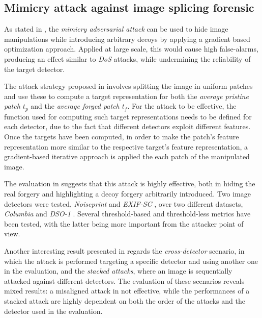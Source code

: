 \documentclass[conference]{IEEEtran} %
\begin{document}
    \subsection{Mimicry attack against image splicing forensic}
        As stated in \cite{boato2024adversarial}, the \textit{mimicry adversarial attack} can be used to hide image manipulations while introducing arbitrary decoys by applying a gradient based optimization approach. Applied at large scale, this would cause high false-alarms, producing an effect similar to \textit{DoS} attacks, while undermining the reliability of the target detector.

        The attack strategy proposed in \cite{boato2024adversarial} involves splitting the image in uniform patches and use these to compute a target representation for both the \textit{average pristine patch $t_p$} and the \textit{average forged patch $t_f$}. For the attack to be effective, the function used for computing such target representations needs to be defined for each detector, due to the fact that different detectors exploit different features. Once the targets have been computed, in order to make the patch's feature representation more similar to the respective target's feature representation, a gradient-based iterative approach is applied the each patch of the manipulated image.

        The evaluation in \cite{boato2024adversarial} suggests that this attack is highly effective, both in hiding the real forgery and highlighting a decoy forgery arbitrarily introduced. Two image detectors were tested, \textit{Noiseprint} \cite{cozzolino2019noiseprint} and \textit{EXIF-SC} \cite{huh2018fighting}, over two different datasets, \textit{Columbia} \cite{ng2004data} and \textit{DSO-1} \cite{carvalho2015illuminant}. Several threshold-based and threshold-less metrics have been tested, with the latter being more important from the attacker point of view.

        Another interesting result presented in \cite{boato2024adversarial} regards the \textit{cross-detector} scenario, in which the attack is performed targeting a specific detector and using another one in the evaluation, and the \textit{stacked attacks}, where an image is sequentially attacked against different detectors. The evaluation of these scenarios reveals mixed results: a misaligned attack in not effective, while the performances of a stacked attack are highly dependent on both the order of the attacks and the detector used in the evaluation.
\end{document}
